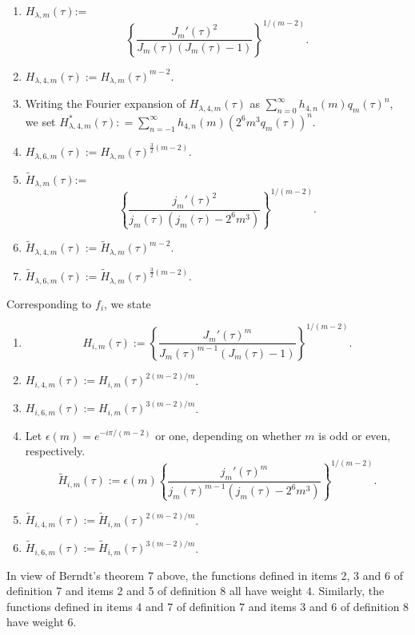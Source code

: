 \documentclass{article}
\begin{document}
\begin{definition}
\begin{enumerate}
\item
$H_{\lambda, m}(\tau)$:=
 $$\left \{
 \frac {J_m'(\tau)^2}
 {J_m(\tau)(J_m(\tau) -1)}
 \right \}^{1/(m-2)}.$$
 \item $H_{\lambda,4,m} (\tau) := 
 H_{\lambda, m}(\tau)^{m-2}.$
 \item Writing the Fourier expansion of  
 $H_{\lambda,4, m}(\tau)$ as
$\sum_{n = 0}^{\infty} h_{4,n}(m) q_m(\tau)^n$,
we set
$H^*_{\lambda,4, m}(\tau): = 
\sum_{n = -1}^{\infty}h_{4,n}(m) (2^6 m^3 q_m(\tau))^n$.
 \item $H_{\lambda,6,m} (\tau) := 
 H_{\lambda, m}(\tau)^{\frac 32 (m-2)}.$
 \item
$\widetilde{H}_{\lambda, m}(\tau)$:=
 $$\left \{
 \frac {j_m'(\tau)^2}
 {j_m(\tau)(j_m(\tau) -2^6 m^3)}
 \right \}^{1/(m-2)}.$$
 \item $\widetilde{H}_{\lambda, 4, m}(\tau) :=
 \widetilde{H}_{\lambda, m}(\tau)^{m-2}$.
  \item $\widetilde{H}_{\lambda, 6, m}(\tau) :=
 \widetilde{H}_{\lambda, m}(\tau)^{\frac 32 (m-2)}$.
 \end{enumerate}
 \end{definition}
 \noindent
  Corresponding to $f_i$, 
 we state
 \begin{definition}
 \begin{enumerate}
 \item
  $$
 H_{i,m}(\tau):=
\left \{
 \frac {J_m'(\tau)^m}
 {J_m(\tau)^{m-1} (J_m(\tau) - 1)}
 \right \}^{1/(m-2)}.$$
  \item  $H_{i,4,m}(\tau):= H_{i,m}(\tau)^{2(m-2)/m}$.
 \item  $H_{i,6,m}(\tau):= H_{i,m}(\tau)^{3(m-2)/m}$.
 \item
 Let $\epsilon(m) = e^{-i \pi/(m-2)}$  or one,
 depending on whether $m$ is odd or even, respectively.
 $$
 \widetilde{H}_{i,m}(\tau):=
\epsilon(m)\left \{
 \frac {j_m'(\tau)^m}
 {j_m(\tau)^{m-1} (j_m(\tau) - 2^6 m^3)}
 \right \}^{1/(m-2)}.$$
 \item 
  $\widetilde{H}_{i,4,m}(\tau):=  
  \widetilde{H}_{i,m}(\tau)^{2(m-2)/m}$.
 \item 
  $\widetilde{H}_{i,6,m}(\tau):=  
  \widetilde{H}_{i,m}(\tau)^{3(m-2)/m}$.
 \end{enumerate}
 \end{definition} 
 \begin{remark}
 In view of Berndt's theorem 7 above, 
 the functions defined in items 2, 3 and 6
 of definition 7 and items 2 and 5 of
 definition 8 all have weight $4$. Similarly,
 the functions defined in
 items 4 and 7 of definition 7 and items
 3 and 6 
 of definition 8 have weight $6$.
 \end{remark} \noindent
\end{document}
